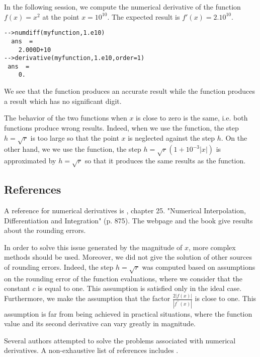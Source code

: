 In the following session, we compute the numerical derivative of the function $f(x)=x^2$
at the point $x=10^{10}$. The expected result is $f'(x)=2.10^{10}$.
\begin{lstlisting}
-->numdiff(myfunction,1.e10)
  ans  =
    2.000D+10  
-->derivative(myfunction,1.e10,order=1)
 ans  =
    0.  
\end{lstlisting}
We see that the  function produces an accurate result while the 
 function produces a result which has no significant digit.

The behavior of the two functions when $x$ is close to zero is the same, i.e. both functions 
produce wrong results. Indeed, when we use the  function, the 
step $h=\sqrt{r}$ is too large so that the point $x$ is neglected against the step $h$. 
On the other hand, we we use the  function, the step $h=\sqrt{r}(1+10^{-3}|x|)$
is approximated by $h=\sqrt{r}$ so that it produces the same 
results as the  function.

\subsection{References}

A reference for numerical derivatives 
is \cite{AbramowitzStegun1972}, chapter 25. "Numerical Interpolation, 
Differentiation and Integration" (p. 875).
The webpage \cite{schimdtnd} and the book \cite{NumericalRecipes} give
results about the rounding errors.

In order to solve this issue generated by the magnitude of $x$, 
more complex methods should be used.
Moreover, we did not give the solution of other sources of rounding errors.
Indeed, the step $h=\sqrt{r}$ was computed based on assumptions on the 
rounding error of the function evaluations, where we consider that the 
constant $c$ is equal to one. This assumption is satisfied only
in the ideal case. Furthermore, we make the assumption that 
the factor $\frac{2|f(x)|}{|f^{\prime \prime}(x)|}$ is close to one.
This assumption is far from being achieved in practical situations,
where the function value and its second derivative can vary greatly 
in magnitude.

Several authors attempted to solve the problems associated with 
numerical derivatives.
A non-exhaustive list of references includes \cite{KelleyNewtonMethod,DumontetVignes1977,1979SteplemanWinarsky,Gill81MurrayWright}.



